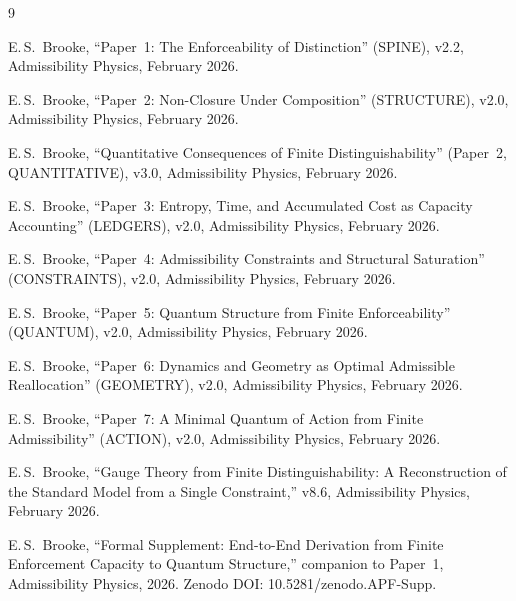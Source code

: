 \documentclass[11pt]{article}
\begin{document}
\begin{thebibliography}{9}

E.\,S.~Brooke, ``Paper~1: The Enforceability of Distinction'' (SPINE), v2.2, Admissibility Physics, February 2026.

E.\,S.~Brooke, ``Paper~2: Non-Closure Under Composition'' (STRUCTURE), v2.0, Admissibility Physics, February 2026.

E.\,S.~Brooke, ``Quantitative Consequences of Finite Distinguishability'' (Paper~2, QUANTITATIVE), v3.0, Admissibility Physics, February 2026.

E.\,S.~Brooke, ``Paper~3: Entropy, Time, and Accumulated Cost as Capacity Accounting'' (LEDGERS), v2.0, Admissibility Physics, February 2026.

E.\,S.~Brooke, ``Paper~4: Admissibility Constraints and Structural Saturation'' (CONSTRAINTS), v2.0, Admissibility Physics, February 2026.

E.\,S.~Brooke, ``Paper~5: Quantum Structure from Finite Enforceability'' (QUANTUM), v2.0, Admissibility Physics, February 2026.

E.\,S.~Brooke, ``Paper~6: Dynamics and Geometry as Optimal Admissible Reallocation'' (GEOMETRY), v2.0, Admissibility Physics, February 2026.

E.\,S.~Brooke, ``Paper~7: A Minimal Quantum of Action from Finite Admissibility'' (ACTION), v2.0, Admissibility Physics, February 2026.

E.\,S.~Brooke, ``Gauge Theory from Finite Distinguishability: A Reconstruction of the Standard Model from a Single Constraint,'' v8.6, Admissibility Physics, February 2026.

E.\,S.~Brooke, ``Formal Supplement: End-to-End Derivation from Finite Enforcement Capacity to Quantum Structure,'' companion to Paper~1, Admissibility Physics, 2026.  Zenodo DOI: 10.5281/zenodo.APF-Supp.

\end{thebibliography}
\end{document}
